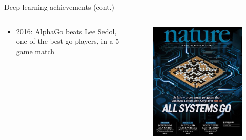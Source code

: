 \documentclass[xcolor=pdftex,dvipsnames,table,mathserif]{beamer}
\begin{document}
\begin{frame}{Deep learning achievements (cont.)}

  \begin{columns}
    \begin{column}{.4\textwidth}
      \begin{itemize}
      \item 2016: AlphaGo beats Lee Sedol, one of the best go players, in a 5-game match
      \end{itemize}
    \end{column}

    \begin{column}{.6\textwidth}

      \begin{figure}[ht]
        \centering
        \includegraphics[width=\textwidth]{nature_go.jpg}
      \end{figure}
    \end{column}
  \end{columns}

\end{frame}
\end{document}
